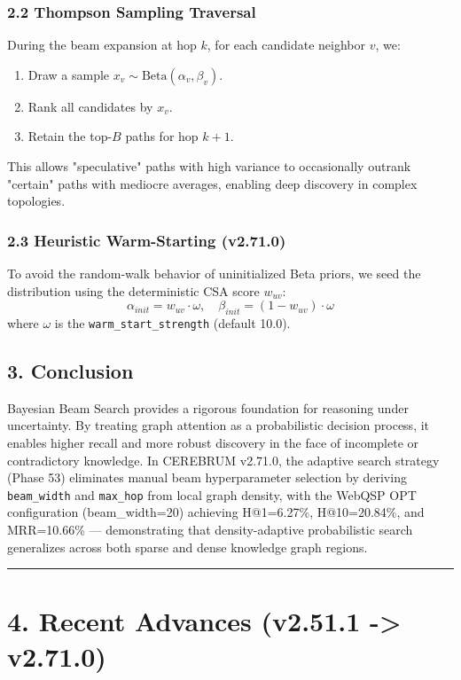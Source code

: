 \subsubsection*{2.2 Thompson Sampling Traversal}
During the beam expansion at hop $k$, for each candidate neighbor $v$, we:
\begin{enumerate}
  \item  Draw a sample $x_v \sim \text{Beta}(\alpha_v, \beta_v)$.
  \item  Rank all candidates by $x_v$.
  \item  Retain the top-$B$ paths for hop $k+1$.
\end{enumerate}


This allows "speculative" paths with high variance to occasionally outrank "certain" paths with mediocre averages, enabling deep discovery in complex topologies.

\subsubsection*{2.3 Heuristic Warm-Starting (v2.71.0)}
To avoid the random-walk behavior of uninitialized Beta priors, we seed the distribution using the deterministic CSA score $w_{uv}$:
$$\alpha_{init} = w_{uv} \cdot \omega, \quad \beta_{init} = (1-w_{uv}) \cdot \omega$$
where $\omega$ is the \texttt{warm\_start\_strength} (default 10.0).

\subsection*{3. Conclusion}
Bayesian Beam Search provides a rigorous foundation for reasoning under uncertainty. By treating graph attention as a probabilistic decision process, it enables higher recall and more robust discovery in the face of incomplete or contradictory knowledge. In CEREBRUM v2.71.0, the adaptive search strategy (Phase 53) eliminates manual beam hyperparameter selection by deriving \texttt{beam\_width} and \texttt{max\_hop} from local graph density, with the WebQSP OPT configuration (beam_width=20) achieving H@1=6.27\%, H@10=20.84\%, and MRR=10.66\% --- demonstrating that density-adaptive probabilistic search generalizes across both sparse and dense knowledge graph regions.

\medskip\noindent\rule{\linewidth}{0.4pt}\medskip

\section*{4. Recent Advances (v2.51.1 -> v2.71.0)}

